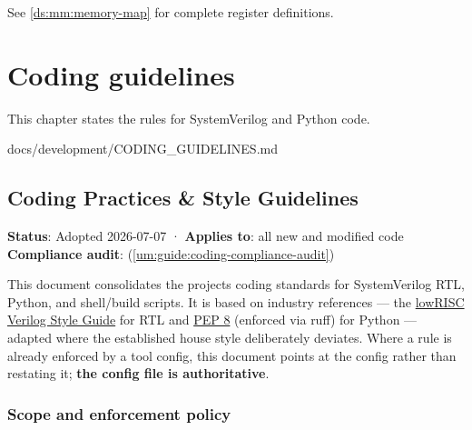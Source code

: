 See \cref{ds:mm:memory-map} for complete register definitions.

\chapter{Coding guidelines}\label{um:ch:coding-guidelines}

This chapter states the rules for SystemVerilog and Python code.

\begin{relocated}{docs/development/CODING_GUIDELINES.md}
\section{Coding Practices \& Style Guidelines}\label{um:guide:coding-guidelines}

\textbf{Status}: Adopted 2026-07-07 · \textbf{Applies to}: all new and
modified code \textbf{Compliance audit}:
 (\cref{um:guide:coding-compliance-audit})

This document consolidates the project\textquotesingle s coding
standards for SystemVerilog RTL, Python, and shell/\allowbreak{}build
scripts. It is based on industry references --- the
\href{https://github.com/lowRISC/style-guides/blob/master/VerilogCodingStyle.md}{lowRISC
Verilog Style Guide} for RTL and
\href{https://peps.python.org/pep-0008/}{PEP 8} (enforced via ruff) for
Python --- adapted where the established house style deliberately
deviates. Where a rule is already enforced by a tool config, this
document points at the config rather than restating it; \textbf{the
config file is authoritative}.

\subsection{Scope and enforcement policy}\label{um:guide:coding-guidelines:scope-and-enforcement-policy}


\end{relocated}
